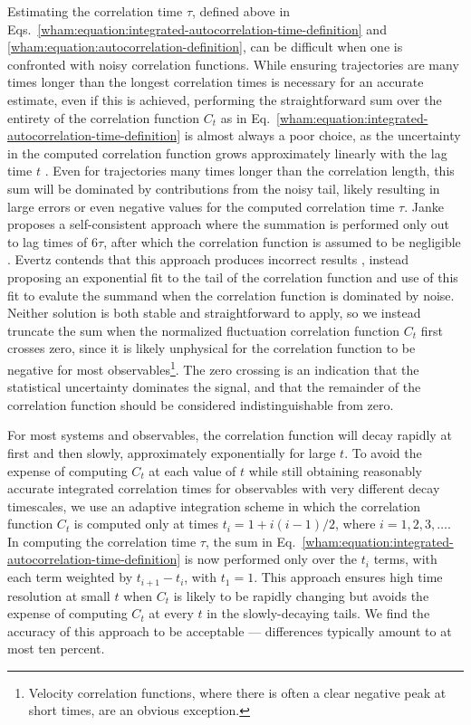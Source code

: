 Estimating the correlation time $\tau$, defined above in Eqs.\ \ref{wham:equation:integrated-autocorrelation-time-definition} and \ref{wham:equation:autocorrelation-definition}, can be difficult when one is confronted with noisy correlation functions.  While ensuring trajectories are many times longer than the longest correlation times is necessary for an accurate estimate, even if this is achieved, performing the straightforward sum over the entirety of the correlation function $C_t$ as in Eq.\ \ref{wham:equation:integrated-autocorrelation-time-definition} is almost always a poor choice, as the uncertainty in the computed correlation function grows approximately linearly with the lag time $t$ \cite{zwanzig:1969a}.  Even for trajectories many times longer than the correlation length, this sum will be dominated by contributions from the noisy tail, likely resulting in large errors or even negative values for the computed correlation time $\tau$.  Janke proposes a self-consistent approach where the summation is performed only out to lag times of $6 \tau$, after which the correlation function is assumed to be negligible \cite{janke:2002a}.  Evertz contends that this approach produces incorrect results \cite{evertz:2003a}, instead proposing an exponential fit to the tail of the correlation function and use of this fit to evalute the summand when the correlation function is dominated by noise.  Neither solution is both stable and straightforward to apply, so we instead truncate the sum when the normalized fluctuation correlation function $C_t$ first crosses zero, since it is likely unphysical for the correlation function to be negative for most observables\footnote{Velocity correlation functions, where there is often a clear negative peak at short times, are an obvious exception.}.  The zero crossing is an indication that the statistical uncertainty dominates the signal, and that the remainder of the correlation function should be considered indistinguishable from zero.

For most systems and observables, the correlation function will decay rapidly at first and then slowly, approximately exponentially for large $t$.  To avoid the expense of computing $C_t$ at each value of $t$ while still obtaining reasonably accurate integrated correlation times for observables with very different decay timescales, we use an adaptive integration scheme in which the correlation function $C_t$ is computed only at times $t_i = 1 + i(i-1)/2$, where $i = 1,2,3,\ldots$.  In computing the correlation time $\tau$, the sum in Eq.\ \ref{wham:equation:integrated-autocorrelation-time-definition} is now performed only over the $t_i$ terms, with each term weighted by $t_{i+1} - t_i$, with $t_1 = 1$.  This approach ensures high time resolution at small $t$ when $C_t$ is likely to be rapidly changing but avoids the expense of computing $C_t$ at every $t$ in the slowly-decaying tails.  We find the accuracy of this approach to be acceptable --- differences typically amount to at most ten percent.

